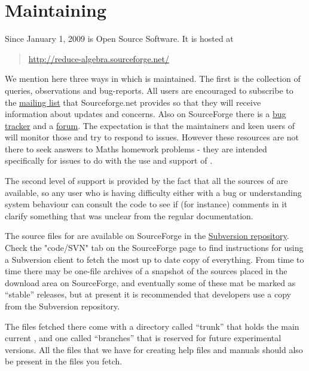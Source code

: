 \chapter {Maintaining {\REDUCE}}

Since January 1, 2009 {\REDUCE} is Open Source Software. It is hosted at
\begin{quote}
  \url{http://reduce-algebra.sourceforge.net/}
\end{quote}
We mention here three ways in which {\REDUCE} is maintained. The first is
the collection of queries, observations and bug-reports. All users are
encouraged to subscribe to the
\href{https://sourceforge.net/mail/?group_id=248416}{mailing list}
that Sourceforge.net provides so that they will receive information
about updates and concerns. Also on SourceForge there is a
\href{https://sourceforge.net/tracker/?group_id=248416}{bug tracker}
and a \href{https://sourceforge.net/forum/?group_id=248416}{forum}.
The expectation is that the maintainers and keen users of {\REDUCE} will
monitor those and try to respond to issues. However these resources
are not there to seek answers to Maths homework problems - they are
intended specifically for issues to do with the use and support of
{\REDUCE}.

The second level of support is provided by the fact that all the sources of 
{\REDUCE} are available, so any user who is having difficulty either with a bug 
or understanding system behaviour can consult the code to see if (for 
instance) comments in it clarify something that was unclear from the regular 
documentation.

The source files for {\REDUCE} are available on SourceForge in the
\href{https://sourceforge.net/svn/?group_id=248416}{Subversion
  repository}. Check the "code/SVN" tab on the SourceForge page to
find instructions for using a Subversion client to fetch the most up
to date copy of everything. From time to time there may be one-file
archives of a snapshot of the sources placed in the download area on
SourceForge, and eventually some of these mat be marked as ``stable''
releases, but at present it is recommended that developers use a copy
from the Subversion repository.

The files fetched there come with a directory called ``trunk'' that holds the 
main current {\REDUCE}, and one called ``branches'' that is reserved for future 
experimental versions. All the files that we have for creating help files and 
manuals should also be present in the files you fetch.

